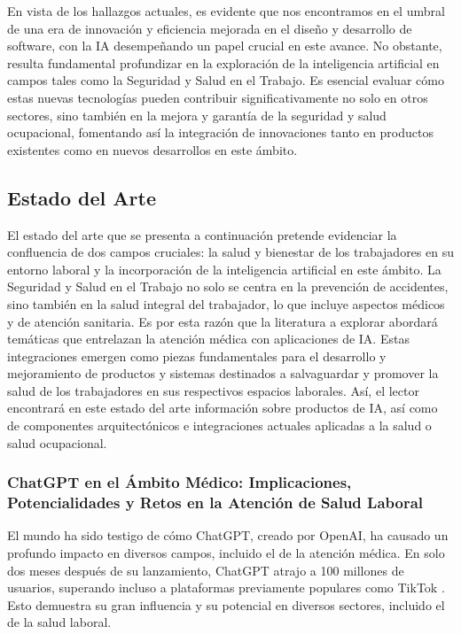 En vista de los hallazgos actuales, es evidente que nos encontramos en el umbral de una era de innovación y eficiencia mejorada en el diseño y desarrollo de software, con la IA desempeñando un papel crucial en este avance. No obstante, resulta fundamental profundizar en la exploración de la inteligencia artificial en campos tales como la Seguridad y Salud en el Trabajo. Es esencial evaluar cómo estas nuevas tecnologías pueden contribuir significativamente no solo en otros sectores, sino también en la mejora y garantía de la seguridad y salud ocupacional, fomentando así la integración de innovaciones tanto en productos existentes como en nuevos desarrollos en este ámbito.

\subsection{Estado del Arte}
El estado del arte que se presenta a continuación pretende evidenciar la confluencia de dos campos cruciales: la salud y bienestar de los trabajadores en su entorno laboral y la incorporación de la inteligencia artificial en este ámbito. La Seguridad y Salud en el Trabajo no solo se centra en la prevención de accidentes, sino también en la salud integral del trabajador, lo que incluye aspectos médicos y de atención sanitaria. Es por esta razón que la literatura a explorar abordará temáticas que entrelazan la atención médica con aplicaciones de IA. Estas integraciones emergen como piezas fundamentales para el desarrollo y mejoramiento de productos y sistemas destinados a salvaguardar y promover la salud de los trabajadores en sus respectivos espacios laborales. Así, el lector encontrará en este estado del arte información sobre productos de IA, así como de componentes arquitectónicos e integraciones actuales aplicadas a la salud o salud ocupacional.

\subsubsection{ChatGPT en el Ámbito Médico: Implicaciones, Potencialidades y Retos en la Atención de Salud Laboral}
El mundo ha sido testigo de cómo ChatGPT, creado por OpenAI, ha causado un profundo impacto en diversos campos, incluido el de la atención médica. En solo dos meses después de su lanzamiento, ChatGPT atrajo a 100 millones de usuarios, superando incluso a plataformas previamente populares como TikTok \citep{Kleesiek2023AnOnly}. Esto demuestra su gran influencia y su potencial en diversos sectores, incluido el de la salud laboral.

